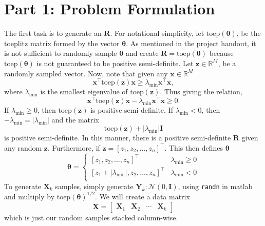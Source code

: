 \documentclass[a4paper]{article}
\begin{document}
\section*{Part 1: Problem Formulation}%
  The first task is to generate an $\mathbf{R}$. For notational simplicity, let $\text{toep}(\bm{\theta})$, be the toeplitz matrix formed by the vector $\bm{\theta}$. As mentioned in the project handout, it is not sufficient to randomly sample $\bm{\theta}$ and create $\mathbf{R} = \text{toep}(\bm{\theta})$ because $\text{toep}(\bm{\theta})$ is not guaranteed to be positive semi-definite.  Let $\bm{z} \in \mathds{R}^M$, be a randomly sampled vector. Now, note that given any $\bm{x} \in \mathds{R}^M$
  \[
    \bm{x}^\top \text{toep}(\bm{z}) \bm{x} \geq \lambda_{\min} \bm{x}^\top \bm{x},
  \]
  where $\lambda_{\min}$ is the smallest eigenvalue of $\text{toep}(\bm{z})$. Thus giving the relation,
  \[
    \bm{x}^\top \text{toep}(\bm{z}) \bm{x} - \lambda_{\min} \bm{x}^\top \bm{x} \geq 0.
  \]
  If $\lambda_{\min} \geq 0$, then $\text{toep}(\bm{z})$ is positive semi-definite. If $\lambda_{\min} < 0$, then $-\lambda_{\min} = |\lambda_{\min}|$ and the matrix
  \[
  \text{toep}(\bm{z}) + |\lambda_{\min}|\mathbf{I}
  \]
  is positive semi-definite. In this manner, there is a positive semi-definite $\mathbf{R}$ given any random $\bm{z}$. Furthermore, if $\bm{z} = [z_1, z_2, \dots, z_n]^\top$. This then defines $\bm{\theta}$ 
  \[
    \bm{\theta} = 
    \begin{cases}
      [z_1, z_2, \dots, z_n]^\top & \lambda_{\min} \geq 0 \\
    [z_1 + |\lambda_{\min}|, z_2, \dots, z_n]^\top & \lambda_{\min} < 0 \\
    \end{cases}
  \]
  To generate $\bm{X}_k$ samples, simply generate $\mathbf{Y}_k: \mathcal{N}\left( 0, \mathbf{I} \right)$, using \texttt{randn} in matlab and multiply by $\text{toep}(\bm{\theta})^{1/2}$. We will create a data matrix
  \[
    \bm{X} = 
    \begin{bmatrix}
      \bm{X}_1 & \bm{X}_2 & \cdots & \bm{X}_k
    \end{bmatrix}
  \]
  which is just our random samples stacked column-wise.
\end{document}
